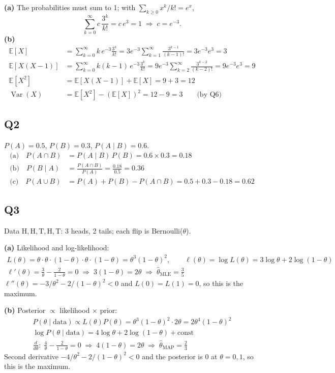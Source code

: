 \documentclass[11pt]{article}
\DeclareMathOperator{\Var}{Var}
\newcommand{\E}{\mathbb{E}}
\begin{document}
\noindent\textbf{(a)} The probabilities must sum to 1; with $\sum_{k\ge0}x^k/k!=e^x$,
\[
\sum_{k=0}^{\infty}c\,\frac{3^k}{k!}=c\,e^{3}=1
\;\Rightarrow\; c=e^{-3}.
\]
\noindent\textbf{(b)}
\begin{align*}
\E[X]&=\sum_{k=0}^{\infty}k\,e^{-3}\frac{3^k}{k!}
=3e^{-3}\sum_{k=1}^{\infty}\frac{3^{k-1}}{(k-1)!}=3e^{-3}e^{3}=3\\
\E[X(X-1)]&=\sum_{k=0}^{\infty}k(k-1)\,e^{-3}\frac{3^k}{k!}
=9e^{-3}\sum_{k=2}^{\infty}\frac{3^{k-2}}{(k-2)!}=9e^{-3}e^{3}=9\\
\E[X^2]&=\E[X(X-1)]+\E[X]=9+3=12\\
\Var(X)&=\E[X^2]-(\E[X])^2=12-9=3 \qquad\text{(by Q6)}
\end{align*}

\subsection{Q2}
$P(A)=0.5$, $P(B)=0.3$, $P(A\mid B)=0.6$.
\begin{align*}
\text{(a)}\quad P(A\cap B)&=P(A\mid B)\,P(B)=0.6\times0.3=0.18\\
\text{(b)}\quad P(B\mid A)&=\frac{P(A\cap B)}{P(A)}=\frac{0.18}{0.5}=0.36\\
\text{(c)}\quad P(A\cup B)&=P(A)+P(B)-P(A\cap B)=0.5+0.3-0.18=0.62
\end{align*}

\subsection{Q3}
Data H,\,H,\,T,\,H,\,T: 3 heads, 2 tails; each flip is Bernoulli($\theta$).

\noindent\textbf{(a)} Likelihood and log-likelihood:
\begin{gather*}
L(\theta)=\theta\cdot\theta\cdot(1-\theta)\cdot\theta\cdot(1-\theta)=\theta^{3}(1-\theta)^{2},\qquad
\ell(\theta)=\log L(\theta)=3\log\theta+2\log(1-\theta)\\
\ell'(\theta)=\frac{3}{\theta}-\frac{2}{1-\theta}=0
\;\Rightarrow\;3(1-\theta)=2\theta\;\Rightarrow\;\hat\theta_{\mathrm{MLE}}=\frac35
\end{gather*}
$\ell''(\theta)=-3/\theta^2-2/(1-\theta)^2<0$ and $L(0)=L(1)=0$, so this is
the maximum.

\noindent\textbf{(b)} Posterior $\propto$ likelihood $\times$ prior:
\begin{gather*}
P(\theta\mid\text{data})\propto L(\theta)P(\theta)=\theta^{3}(1-\theta)^{2}\cdot2\theta=2\theta^{4}(1-\theta)^{2}\\
\log P(\theta\mid\text{data})=4\log\theta+2\log(1-\theta)+\text{const}\\
\frac{d}{d\theta}:\;\frac{4}{\theta}-\frac{2}{1-\theta}=0
\;\Rightarrow\;4(1-\theta)=2\theta\;\Rightarrow\;\hat\theta_{\mathrm{MAP}}=\frac23
\end{gather*}
Second derivative $-4/\theta^2-2/(1-\theta)^2<0$ and the posterior is $0$ at
$\theta=0,1$, so this is the maximum.
\end{document}
